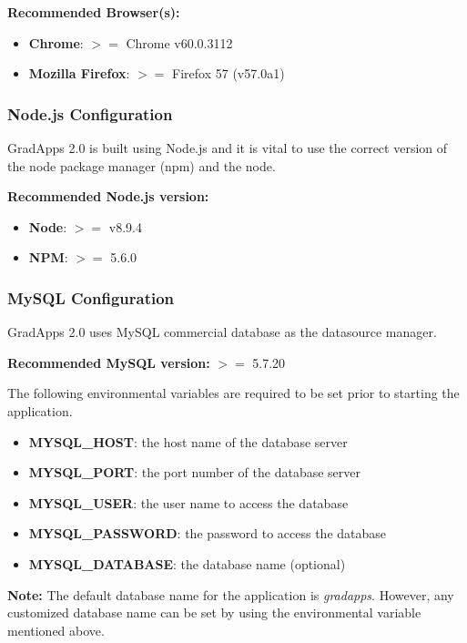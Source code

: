 \documentclass[fontsize=12pt,paper=letter,twoside]{scrartcl}
\begin{document}
\bigskip
\noindent\textbf{Recommended Browser(s):}

\begin{itemize}
\item \textbf{Chrome}: $>=$ Chrome v60.0.3112
\item \textbf{Mozilla Firefox}: $>=$ Firefox 57 (v57.0a1)
\end{itemize}

\subsubsection{Node.js Configuration}
GradApps 2.0 is built using Node.js and it is vital to use the correct version of the node package manager (npm) and the node.

\bigskip
\noindent\textbf{Recommended Node.js version:}

\begin{itemize}
\item \textbf{Node}: $>=$ v8.9.4
\item \textbf{NPM}: $>=$ 5.6.0
\end{itemize}

\subsubsection{MySQL Configuration}
GradApps 2.0 uses MySQL commercial database as the datasource manager.

\bigskip
\noindent \textbf{Recommended MySQL version:} $>=$ 5.7.20

\bigskip
\noindent The following environmental variables are required to be set prior to starting the application.

\begin{itemize}
\item \textbf{MYSQL\_HOST}: the host name of the database server
\item \textbf{MYSQL\_PORT}: the port number of the database server
\item \textbf{MYSQL\_USER}: the user name to access the database
\item \textbf{MYSQL\_PASSWORD}: the password to access the database
\item \textbf{MYSQL\_DATABASE}: the database name (optional)
\end{itemize}

\bigskip
\noindent \textbf{Note:} The default database name for the application is \emph{gradapps}. However, any customized database name can be set by using the environmental variable mentioned above.
\end{document}
